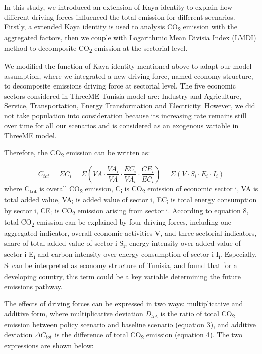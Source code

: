 \documentclass[
]{article}
\begin{document}
In this study, we introduced an extension of Kaya identity to explain
how different driving forces influenced the total emission for different
scenarios. Firstly, a extended Kaya identity is used to analysis
CO\textsubscript{2} emission with the aggregated factors, then we couple
with Logarithmic Mean Divisia Index (LMDI) method to decomposite
CO\textsubscript{2} emission at the sectorial level.

We modified the function of Kaya identity mentioned above to adapt our
model assumption, where we integrated a new driving force, named economy
structure, to decomposite emissions driving force at sectorial level.
The five economic sectors considered in ThreeME Tunisia model are:
Industry and Agriculture, Service, Transportation, Energy Transformation
and Electricity. However, we did not take population into consideration
because its increasing rate remains still over time for all our
scenarios and is considered as an exogenous variable in ThreeME model.

Therefore, the CO\textsubscript{2} emission can be written as:

\[  C_{tot} = \Sigma C_{i} = \Sigma( VA \cdot \frac{VA_{i}}{VA} \cdot \frac{EC_{i}}{VA_{i}} \cdot \frac{CE_{i}}{EC_{i}} )=  \Sigma( V \cdot S_{i} \cdot E_{i} \cdot I_{i}) \tag{2}\]
where C\textsubscript{tot} is overall CO\textsubscript{2} emission,
C\textsubscript{i} is CO\textsubscript{2} emission of economic sector i,
VA is total added value, VA\textsubscript{i} is added value of sector i,
EC\textsubscript{i} is total energy consumption by sector i,
CE\textsubscript{i} is CO\textsubscript{2} emission arising from sector
i. According to equation 8, total CO\textsubscript{2} emission can be
explained by four driving forces, including one aggregated indicator,
overall economic activities V, and three sectorial indicators, share of
total added value of sector i S\textsubscript{i}, energy intensity over
added value of sector i E\textsubscript{i} and carbon intensity over
energy consumption of sector i I\textsubscript{i}. Especially,
S\textsubscript{i} can be interpreted as economy structure of Tunisia,
\textcite{grubb2015} and \textcite{kanitkar2015} found that for a
developing country, this term could be a key variable determining the
future emissions pathway.

The effects of driving forces can be expressed in two ways:
multiplicative and additive form, where multiplicative deviation
\(D_{tot}\) is the ratio of total CO\textsubscript{2} emission between
policy scenario and baseline scenario (equation 3), and additive
deviation \(\Delta C_{tot}\) is the difference of total
CO\textsubscript{2} emission (equation 4). The two expressions are shown
below:
\end{document}
